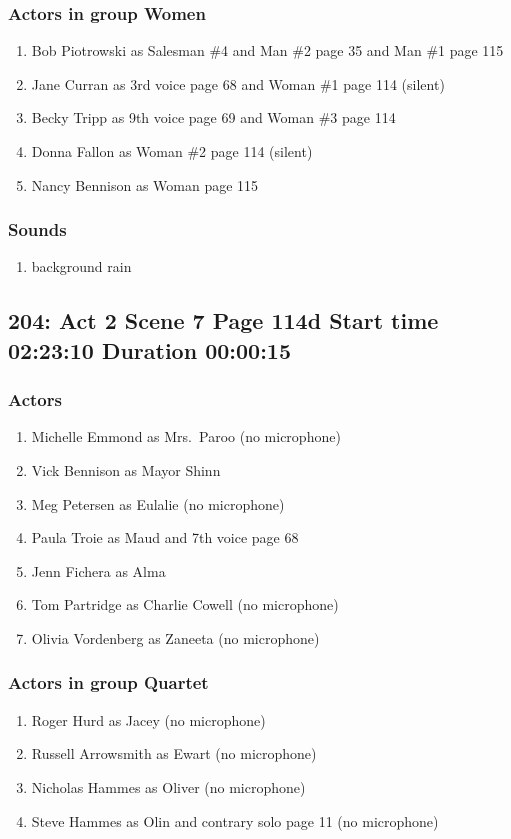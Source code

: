 \subsubsection{Actors in group Women}
\begin{enumerate}
\item Bob Piotrowski as Salesman \#4 and Man \#2 page 35 and Man \#1 page 115
\item Jane Curran as 3rd voice page 68 and Woman \#1 page 114 (silent)
\item Becky Tripp as 9th voice page 69 and Woman \#3 page 114
\item Donna Fallon as Woman \#2 page 114 (silent)
\item Nancy Bennison as Woman page 115
\end{enumerate}

\subsubsection{Sounds}
\begin{enumerate}
\item background rain
\end{enumerate}
\subsection{204: Act 2 Scene 7 Page 114d Start time 02:23:10 Duration 00:00:15}

\subsubsection{Actors}
\begin{enumerate}
\item Michelle Emmond as Mrs.~Paroo (no microphone)
\item Vick Bennison as Mayor Shinn
\item Meg Petersen as Eulalie (no microphone)
\item Paula Troie as Maud and 7th voice page 68
\item Jenn Fichera as Alma
\item Tom Partridge as Charlie Cowell (no microphone)
\item Olivia Vordenberg as Zaneeta (no microphone)
\end{enumerate}
\subsubsection{Actors in group Quartet}
\begin{enumerate}
\item Roger Hurd as Jacey (no microphone)
\item Russell Arrowsmith as Ewart (no microphone)
\item Nicholas Hammes as Oliver (no microphone)
\item Steve Hammes as Olin and contrary solo page 11 (no microphone)
\end{enumerate}
